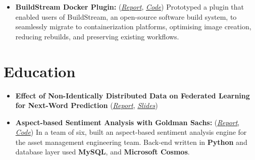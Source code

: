 \documentclass[a4paper]{deedy-resume} %
\begin{document}
\begin{itemize}
    \item \textbf{BuildStream Docker Plugin:}
          (\href{https://github.com/shashwatdalal/shashwatdalal.github.io/blob/master/files/placement_report.pdf}{\textit{Report}},
          \href{https://gitlab.com/BuildStream/bst-plugins-container}{\textit{Code}})
          \linebreak
          Prototyped a plugin that enabled users of BuildStream, an open-source software build system, to
          seamlessly migrate to containerization platforms, optimising image creation, reducing rebuilds, and preserving existing workflows.
\end{itemize}
\section{Education}
\begin{itemize}
    \item \textbf{Effect of Non-Identically Distributed Data on Federated Learning for Next-Word Prediction}
          \linebreak
          (\href{https://shashwatdalal.github.io/files/fl_fyp.pdf}{\textit{Report}},
          \href{https://bit.ly/3bpAU8g}{\textit{Slides}})
    \item \textbf{Aspect-based Sentiment Analysis with Goldman Sachs:}
          (\href{https://github.com/shashwatdalal/shashwatdalal.github.io/blob/master/files/Software_Engineering_Project_Report.pdf}{\textit{Report}},
          \href{https://dev.azure.com/vapesoc/362\%20Software\%20Engineering\%20Project/}{\textit{Code}})
          \linebreak
          In a team of six, built an aspect-based sentiment analysis engine for the asset management engineering team. Back-end written in \textbf{Python} and database layer used \textbf{MySQL}, and \textbf{Microsoft Cosmos}.

\end{itemize}
\end{document}

